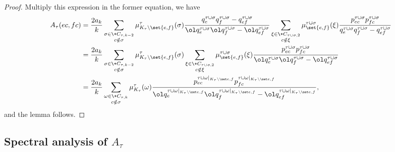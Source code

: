 \documentclass[a4paper,11pt]{article}
\begin{document}
\begin{proof}
    Multiply this expression in the former equation, we have
    \begin{align*}
        A_\tau(ec, fc)
        &=  \frac{2a_k}{k}
              \sum_{\substack{\sigma\in \+C_{\tau, k-2}\\ c\notin\sigma}}
              \mu^\tau_{K_\tau\setminus\set{e, f}}(\sigma)
              \frac{
              {q^{\tau\cup\sigma}_{e}q^{\tau\cup\sigma}_f - q^{\tau\cup\sigma}_{ef}}
              }{
              {\ol q^{\tau\cup\sigma}_{e}\ol q^{\tau\cup\sigma}_f - \ol q^{\tau\cup\sigma}_{ef}}
              }
              \sum_{\substack{\xi\in \+C_{\tau\cup\sigma, 2}\\ c\notin \xi}}
              \mu^{\tau\cup\sigma}_{\set{e, f}}(\xi)
                    \frac{p^{\tau\cup\sigma}_{ec}p^{\tau\cup\sigma}_{fc}}
                    {q^{\tau\cup\sigma}_{e}q^{\tau\cup\sigma}_f - q^{\tau\cup\sigma}_{ef}}
      \\&=  \frac{2a_k}{k}
              \sum_{\substack{\sigma\in \+C_{\tau, k-2}\\ c\notin\sigma}}
              \mu^\tau_{K_\tau\setminus\set{e, f}}(\sigma)
              \sum_{\substack{\xi\in \+C_{\tau\cup\sigma, 2}\\ c\notin \xi}}
              \mu^{\tau\cup\sigma}_{\set{e, f}}(\xi)
                    \frac{p^{\tau\cup\sigma}_{ec}p^{\tau\cup\sigma}_{fc}}
                         {\ol q^{\tau\cup\sigma}_{e}\ol q^{\tau\cup\sigma}_f - \ol q^{\tau\cup\sigma}_{ef}}
      \\&=  \frac{2a_k}{k}
              \sum_{\substack{\omega\in \+C_{\tau, k}\\ c\notin\sigma}}
              \mu^\tau_{K_\tau}(\omega)
                    \frac{p^{\taur}_{ec}p^{\taur}_{fc}}
                         {\ol q^{\taur}_{e}\ol q^{\taur}_f - \ol q^{\taur}_{ef}},
    \end{align*}
    and the lemma follows.
\end{proof}

\subsection{Spectral analysis of $A_\tau$}
\end{document}
